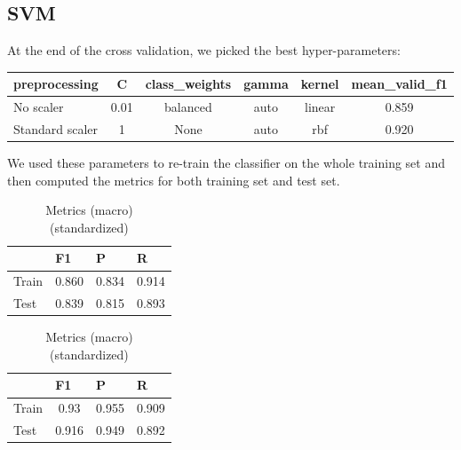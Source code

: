 \documentclass[12pt]{article}
\begin{document}
\newpage
\subsection{SVM}
At the end of the cross validation, we picked the best hyper-parameters:
\begin{table}[h]
\centering
\begin{tabular}{lccccc}
\toprule
 preprocessing & C & class\_weights & gamma &  kernel & mean\_valid\_f1 \\
\midrule
No scaler                  &           0.01 &                  balanced &               auto &              linear &             0.859 \\
Standard scaler                 &              1 &                      None &               auto &                 rbf &            0.920 \\
\bottomrule
\end{tabular}
\end{table}

We used these parameters to re-train the classifier on the whole training set and then computed the metrics for both training set and test set. 

\begin{table}[ht]
\begin{minipage}[b]{0.5\linewidth}
\centering
    \vfill
    \begin{tabular}{@{}lccc@{}}
    \toprule
     & \multicolumn{1}{l}{F1} & \multicolumn{1}{l}{P} & \multicolumn{1}{l}{R } \\ \midrule
    Train & 0.860 & 0.834 & 0.914 \\
    Test & 0.839 & 0.815 & 0.893 \\ \bottomrule
    \end{tabular}
    \vfill

\caption{Metrics (macro)}
\label{table:knn_res}
\end{minipage}\hfill
\begin{minipage}[b]{0.5\linewidth}
\centering
    \vfill
    \begin{tabular}{@{}lccc@{}}
    \toprule
     & \multicolumn{1}{l}{F1} & \multicolumn{1}{l}{P} & \multicolumn{1}{l}{R } \\ \midrule
    Train & 0.93 & 0.955 & 0.909 \\
    Test & 0.916 & 0.949 & 0.892 \\ \bottomrule
    \end{tabular}
    \vfill
\caption{Metrics (macro) (standardized)}
\label{table:knn_res}
\end{minipage}\hfill
\end{table}
\end{document}
